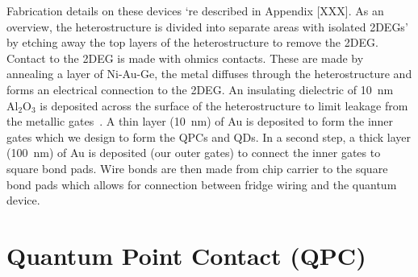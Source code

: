 Fabrication details on these devices `re described in Appendix [XXX]. As an overview, the heterostructure is divided into separate areas with isolated 2DEGs' by etching away the top layers of the heterostructure to remove the 2DEG. Contact to the 2DEG is made with ohmics contacts. These are made by annealing a layer of Ni-Au-Ge, the metal diffuses through the heterostructure and forms an electrical connection to the 2DEG. An insulating dielectric of \qty{10}{nm} $\mathrm{Al_2O_3}$ is deposited across the surface of the heterostructure to limit leakage from the metallic gates~\cite{insulating_gates}.  A thin layer (\qty{10}{nm}) of Au is deposited to form the inner gates which we design to form the QPCs and QDs. In a second step, a thick layer (\qty{100}{nm}) of Au is deposited (our outer gates) to connect the inner gates to square bond pads. Wire bonds are then made from chip carrier to the square bond pads which allows for connection between fridge wiring and the quantum device. 




\afterpage{\clearpage}
\section{Quantum Point Contact (QPC)}

